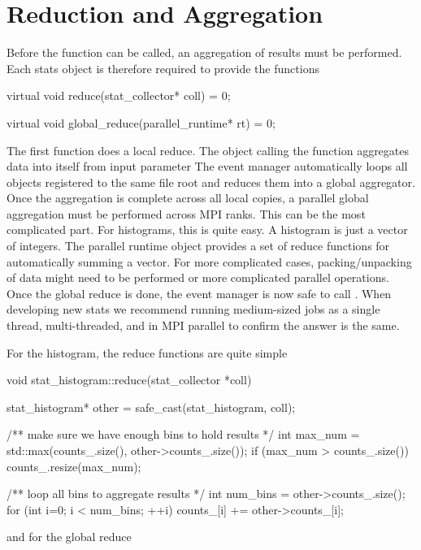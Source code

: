 \section{Reduction and Aggregation}\label{sec:reduceStats}
Before the  function can be called, an aggregation of results must be performed.
Each stats object is therefore required to provide the functions

\begin{CppCode} 
virtual void reduce(stat_collector* coll) = 0;

virtual void global_reduce(parallel_runtime* rt) = 0;
\end{CppCode}
The first function does a local reduce.
The object calling the  function aggregates data into itself from input parameter 
The event manager automatically loops all objects registered to the same file root and reduces them into a global aggregator.
Once the aggregation is complete across all local copies,
a parallel global aggregation must be performed across MPI ranks.
This can be the most complicated part.
For histograms, this is quite easy.
A histogram is just a vector of integers.
The \sstmacro parallel runtime object provides a set of reduce functions for automatically summing a vector.
For more complicated cases, packing/unpacking of data might need to be performed or more complicated parallel operations.
Once the global reduce is done, the event manager is now safe to call .
When developing new stats we recommend running medium-sized jobs as a single thread, multi-threaded, and in MPI parallel to confirm the answer is the same.

For the histogram, the reduce functions are quite simple

\begin{CppCode}
void stat_histogram::reduce(stat_collector *coll)
{
  stat_histogram* other = safe_cast(stat_histogram, coll);

  /** make sure we have enough bins to hold results */
  int max_num = std::max(counts_.size(), other->counts_.size());
  if (max_num > counts_.size()){
    counts_.resize(max_num);
  }

  /** loop all bins to aggregate results */
  int num_bins = other->counts_.size();
  for (int i=0; i < num_bins; ++i){
    counts_[i] += other->counts_[i];
  }
}
\end{CppCode}

and for the global reduce

